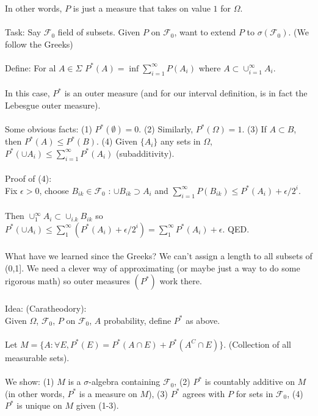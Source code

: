 \documentclass[12pt]{article}
\begin{document}
In other words, $P$ is just a measure that takes on value $1$ for $\Omega$.
\\ \\
Task: Say $\mathcal{F}_0$ field of subsets.  Given $P$ on $\mathcal{F}_0$, want to extend $P$ to $\sigma(\mathcal{F}_0)$.  (We follow the Greeks)
\\ \\
Define: For al $A \in \Sigma$ $P^*(A) = \inf \sum_{i=1}^\infty P(A_i)$ where $A \subset \cup_{i=1}^\infty A_i$.
\\ \\
In this case, $P^*$ is an outer measure (and for our interval definition, is in fact the Lebesgue outer measure).
\\ \\
Some obvious facts: (1) $P^*(\emptyset) = 0$.  (2) Similarly, $P^*(\Omega) = 1$.  (3) If $A \subset B$, then $P^*(A) \le P^*(B)$.  (4) Given $\{A_i\}$ any sets in $\Omega$, $P^*(\cup A_i) \le \sum_{i=1}^\infty P^*(A_i)$ (subadditivity).
\\ \\
Proof of (4): \\
Fix $\epsilon > 0$, choose $B_{ik} \in \mathcal{F}_0$ : $\cup B_{ik} \supset A_i$ and $\sum_{i=1}^\infty P(B_{ik}) \le P^*(A_i) + \epsilon/2^i$.
\\ \\
Then $\cup_1^\infty A_i \subset \cup_{i.k} B_{ik}$ so $P^*(\cup A_i) \le \sum_1^\infty (P^*(A_i) + \epsilon / 2^i) = \sum_1^\infty P^*(A_i) + \epsilon$.  QED.
\\ \\
What have we learned since the Greeks?  We can't assign a length to all subsets of (0,1].  We need a clever way of approximating (or maybe just a way to do some rigorous math) so outer measures $(P^*)$ work there.
\\ \\
Idea: (Caratheodory): \\
Given $\Omega$, $\mathcal{F}_0$, $P$ on $\mathcal{F}_0$, $A$ probability, define $P^*$ as above.
\\ \\
Let $M = \{ A : \forall E, P^*(E) = P^*(A \cap E) + P^*(A^C \cap E) \}$.  (Collection of all measurable sets).
\\ \\
We show: (1) $M$ is a $\sigma$-algebra containing $\mathcal{F}_0$, (2) $P^*$ is countably additive on $M$ (in other words, $P^*$ is a measure on $M$), (3) $P^*$ agrees with $P$ for sets in $\mathcal{F}_0$, (4) $P^*$ is unique on $M$ given (1-3).
\end{document}
